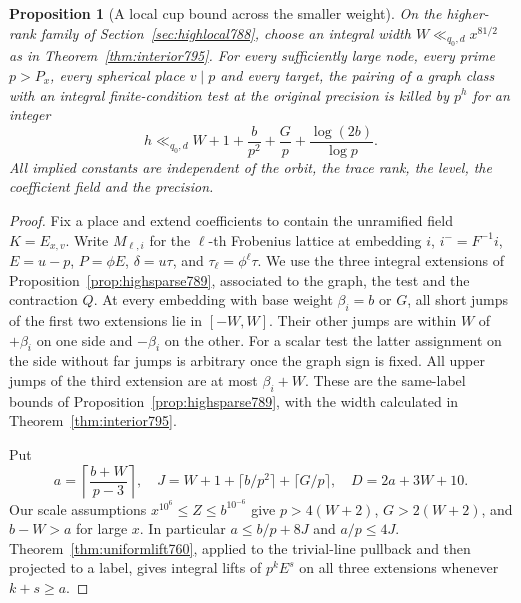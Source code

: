 \documentclass[a4paper,11pt]{article}
\newtheorem{proposition}{Proposition}[section]
\theoremstyle{definition}
\theoremstyle{remark}
\numberwithin{equation}{section}
\begin{document}
\begin{proposition}[A local cup bound across the smaller weight]
\leavevmode\label{prop:transitioncup796}
On the higher-rank family of Section~\ref{sec:highlocal788},
choose an integral width \(W\ll_{q_0,d}x^{81/2}\) as in
Theorem~\ref{thm:interior795}. For every sufficiently large
node, every prime \(p>P_x\), every spherical place \(v\mid p\)
and every target, the pairing of a graph class with an integral
finite-condition test at the original precision is killed by
\(p^h\) for an integer
\[
       h\ll_{q_0,d} W+1+\frac{b}{p^2}+\frac{G}{p}
                                  +\frac{\log(2b)}{\log p}.
\]
All implied constants are independent of the orbit, the trace
rank, the level, the coefficient field and the precision.
\end{proposition}
\begin{proof}
Fix a place and extend coefficients to contain the unramified
field \(K=E_{x,v}\). Write \(M_{\ell,i}\) for the \(\ell\)-th
Frobenius lattice at embedding \(i\), \(i^-=F^{-1}i\),
\(E=u-p\), \(P=\phi E\), \(\delta=u\tau\), and \(\tau_\ell=\phi^\ell\tau\).
We use the three integral extensions of
Proposition~\ref{prop:highsparse789}, associated to the graph,
the test and the contraction \(Q\). At every embedding with
base weight \(\beta_i=b\) or \(G\), all short jumps of the first
two extensions lie in \([-W,W]\). Their other jumps are within
\(W\) of \(+\beta_i\) on one side and \(-\beta_i\) on the
other. For a scalar test the latter assignment on the side
without far jumps is arbitrary once the graph sign is fixed.
All upper jumps of the third extension are at most \(\beta_i+W\).
These are the same-label bounds of Proposition~\ref{prop:highsparse789},
with the width calculated in Theorem~\ref{thm:interior795}.

Put
\[
 a=\left\lceil\frac{b+W}{p-3}\right\rceil,\quad
 J=W+1+\lceil b/p^2\rceil+\lceil G/p\rceil,\quad
 D=2a+3W+10 .
\]
Our scale assumptions \(x^{10^6}\le Z\le b^{10^{-6}}\)
give \(p>4(W+2)\), \(G>2(W+2)\), and \(b-W>a\) for large
\(x\). In particular \(a\le b/p+8J\) and \(a/p\le4J\).
Theorem~\ref{thm:uniformlift760}, applied to the trivial-line
pullback and then projected to a label, gives integral lifts
of \(p^k E^s\) on all three extensions whenever \(k+s\ge a\).


\end{proof}
\end{document}
